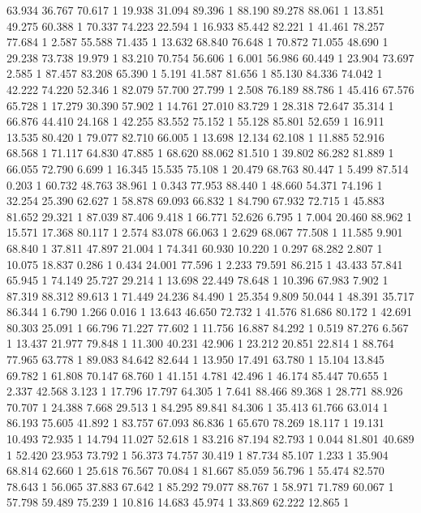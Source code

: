 	63.934	36.767	70.617	1
	19.938	31.094	89.396	1
	88.190	89.278	88.061	1
	13.851	49.275	60.388	1
	70.337	74.223	22.594	1
	16.933	85.442	82.221	1
	41.461	78.257	77.684	1
	2.587	55.588	71.435	1
	13.632	68.840	76.648	1
	70.872	71.055	48.690	1
	29.238	73.738	19.979	1
	83.210	70.754	56.606	1
	6.001	56.986	60.449	1
	23.904	73.697	2.585	1
	87.457	83.208	65.390	1
	5.191	41.587	81.656	1
	85.130	84.336	74.042	1
	42.222	74.220	52.346	1
	82.079	57.700	27.799	1
	2.508	76.189	88.786	1
	45.416	67.576	65.728	1
	17.279	30.390	57.902	1
	14.761	27.010	83.729	1
	28.318	72.647	35.314	1
	66.876	44.410	24.168	1
	42.255	83.552	75.152	1
	55.128	85.801	52.659	1
	16.911	13.535	80.420	1
	79.077	82.710	66.005	1
	13.698	12.134	62.108	1
	11.885	52.916	68.568	1
	71.117	64.830	47.885	1
	68.620	88.062	81.510	1
	39.802	86.282	81.889	1
	66.055	72.790	6.699	1
	16.345	15.535	75.108	1
	20.479	68.763	80.447	1
	5.499	87.514	0.203	1
	60.732	48.763	38.961	1
	0.343	77.953	88.440	1
	48.660	54.371	74.196	1
	32.254	25.390	62.627	1
	58.878	69.093	66.832	1
	84.790	67.932	72.715	1
	45.883	81.652	29.321	1
	87.039	87.406	9.418	1
	66.771	52.626	6.795	1
	7.004	20.460	88.962	1
	15.571	17.368	80.117	1
	2.574	83.078	66.063	1
	2.629	68.067	77.508	1
	11.585	9.901	68.840	1
	37.811	47.897	21.004	1
	74.341	60.930	10.220	1
	0.297	68.282	2.807	1
	10.075	18.837	0.286	1
	0.434	24.001	77.596	1
	2.233	79.591	86.215	1
	43.433	57.841	65.945	1
	74.149	25.727	29.214	1
	13.698	22.449	78.648	1
	10.396	67.983	7.902	1
	87.319	88.312	89.613	1
	71.449	24.236	84.490	1
	25.354	9.809	50.044	1
	48.391	35.717	86.344	1
	6.790	1.266	0.016	1
	13.643	46.650	72.732	1
	41.576	81.686	80.172	1
	42.691	80.303	25.091	1
	66.796	71.227	77.602	1
	11.756	16.887	84.292	1
	0.519	87.276	6.567	1
	13.437	21.977	79.848	1
	11.300	40.231	42.906	1
	23.212	20.851	22.814	1
	88.764	77.965	63.778	1
	89.083	84.642	82.644	1
	13.950	17.491	63.780	1
	15.104	13.845	69.782	1
	61.808	70.147	68.760	1
	41.151	4.781	42.496	1
	46.174	85.447	70.655	1
	2.337	42.568	3.123	1
	17.796	17.797	64.305	1
	7.641	88.466	89.368	1
	28.771	88.926	70.707	1
	24.388	7.668	29.513	1
	84.295	89.841	84.306	1
	35.413	61.766	63.014	1
	86.193	75.605	41.892	1
	83.757	67.093	86.836	1
	65.670	78.269	18.117	1
	19.131	10.493	72.935	1
	14.794	11.027	52.618	1
	83.216	87.194	82.793	1
	0.044	81.801	40.689	1
	52.420	23.953	73.792	1
	56.373	74.757	30.419	1
	87.734	85.107	1.233	1
	35.904	68.814	62.660	1
	25.618	76.567	70.084	1
	81.667	85.059	56.796	1
	55.474	82.570	78.643	1
	56.065	37.883	67.642	1
	85.292	79.077	88.767	1
	58.971	71.789	60.067	1
	57.798	59.489	75.239	1
	10.816	14.683	45.974	1
	33.869	62.222	12.865	1
